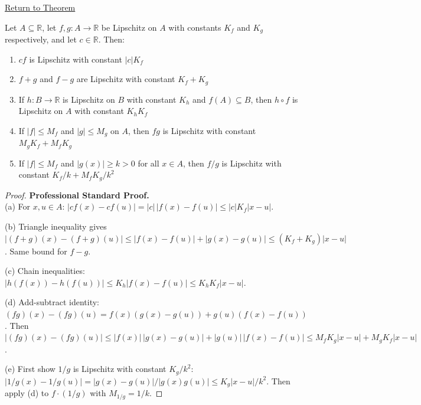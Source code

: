 \newpage
{}
\label{prf:algebra-of-lipschitz-functions}

\begin{remark*}[Return]
\hyperref[thm:algebra-of-lipschitz-functions]{Return to Theorem}
\end{remark*}

\begin{theorem*}
Let $A \subseteq \mathbb{R}$, let $f, g : A \to \mathbb{R}$ be Lipschitz on $A$ with constants $K_f$ and $K_g$ respectively, and let $c \in \mathbb{R}$. Then:
\begin{enumerate}
\item[(a)] $cf$ is Lipschitz with constant $|c|K_f$
\item[(b)] $f + g$ and $f - g$ are Lipschitz with constant $K_f + K_g$
\item[(c)] If $h : B \to \mathbb{R}$ is Lipschitz on $B$ with constant $K_h$ and $f(A) \subseteq B$, then $h \circ f$ is Lipschitz on $A$ with constant $K_h K_f$
\item[(d)] If $|f| \leq M_f$ and $|g| \leq M_g$ on $A$, then $fg$ is Lipschitz with constant $M_g K_f + M_f K_g$
\item[(e)] If $|f| \leq M_f$ and $|g(x)| \geq k > 0$ for all $x \in A$, then $f/g$ is Lipschitz with constant $K_f/k + M_f K_g/k^2$
\end{enumerate}
\end{theorem*}

\begin{proof}
\textbf{Professional Standard Proof.}~\\
(a) For $x, u \in A$: $|cf(x) - cf(u)| = |c|\,|f(x) - f(u)| \leq |c| K_f |x - u|$.

(b) Triangle inequality gives $|(f + g)(x) - (f + g)(u)| \leq |f(x) - f(u)| + |g(x) - g(u)| \leq (K_f + K_g)|x - u|$. Same bound for $f - g$.

(c) Chain inequalities: $|h(f(x)) - h(f(u))| \leq K_h |f(x) - f(u)| \leq K_h K_f |x - u|$.

(d) Add-subtract identity: $(fg)(x) - (fg)(u) = f(x)(g(x) - g(u)) + g(u)(f(x) - f(u))$. Then $|(fg)(x) - (fg)(u)| \leq |f(x)|\,|g(x) - g(u)| + |g(u)|\,|f(x) - f(u)| \leq M_f K_g |x - u| + M_g K_f |x - u|$.

(e) First show $1/g$ is Lipschitz with constant $K_g/k^2$: $|1/g(x) - 1/g(u)| = |g(x) - g(u)|/|g(x)g(u)| \leq K_g|x - u|/k^2$. Then apply (d) to $f \cdot (1/g)$ with $M_{1/g} = 1/k$.
\end{proof}

